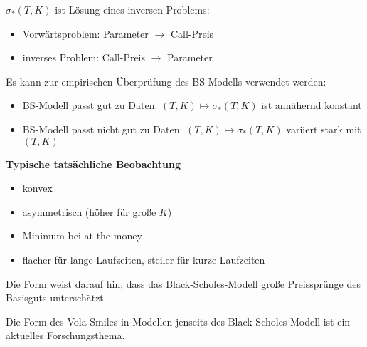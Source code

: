 \begin{*bemerkung}
	$\sigma_\ast(T,K)$ ist Lösung eines inversen Problems:
	\begin{itemize}[nolistsep, topsep=-\parskip]
		\item Vorwärtsproblem: Parameter $\to$ Call-Preis
		\item inverses Problem: Call-Preis $\to$ Parameter
	\end{itemize}
	Es kann zur empirischen Überprüfung des BS-Modells verwendet werden:
	\begin{itemize}[nolistsep, topsep=-\parskip]
		\item BS-Modell passt gut zu Daten: $(T,K) \mapsto \sigma_\ast(T,K)$ ist annähernd konstant
		\item BS-Modell passt nicht gut zu Daten: $(T,K) \mapsto \sigma_\ast(T,K)$ variiert stark mit $(T,K)$
	\end{itemize}
\end{*bemerkung}

\textbf{Typische tatsächliche Beobachtung }
\begin{itemize}[nolistsep, topsep=-\parskip]
	\item konvex
	\item asymmetrisch (höher für große $K$)
	\item Minimum bei at-the-money
	\item flacher für lange Laufzeiten, steiler für kurze Laufzeiten
\end{itemize}

Die Form weist darauf hin, dass das Black-Scholes-Modell große Preissprünge des Basisguts unterschätzt.

Die Form des Vola-Smiles in Modellen jenseits des Black-Scholes-Modell ist ein aktuelles Forschungsthema.